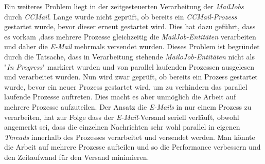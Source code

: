 \newline
\newline
Ein weiteres Problem liegt in der zeitgesteuerten Verarbeitung der \emph{MailJobs} durch \emph{CCMail}. Lange wurde nicht geprüft, ob bereits ein \emph{CCMail-Prozess} gestartet wurde, bevor dieser erneut gestartet wird. Dies hat dazu geführt, dass es vorkam ,dass mehrere Prozesse gleichzeitig die \emph{MailJob-Entitäten} verarbeiten und daher die \emph{E-Mail} mehrmals versendet wurden. Dieses Problem ist begründet durch die Tatsache, dass in Verarbeitung stehende \emph{MailoJob-Entitäten} nicht als "\emph{In Progress}" markiert wurden und von parallel laufenden Prozessen ausgelesen und verarbeitet wurden. Nun wird zwar geprüft, ob bereits ein Prozess gestartet wurde, bevor ein neuer Prozess gestartet wird, um zu verhindern das parallel laufende Prozesse auftreten. Dies macht es aber unmöglich die Arbeit auf mehrere Prozesse aufzuteilen. Der Ansatz die \emph{E-Mails} in nur einem Prozess zu verarbeiten, hat zur Folge dass der \emph{E-Mail}-Versand seriell verläuft, obwohl angemerkt sei, dass die einzelnen Nachrichten sehr wohl parallel in eigenen \emph{Threads} innerhalb des Prozesses verarbeitet und versendet werden. Man könnte die Arbeit auf mehrere Prozesse aufteilen und so die Performance verbessern und den Zeitaufwand für den Versand minimieren.

